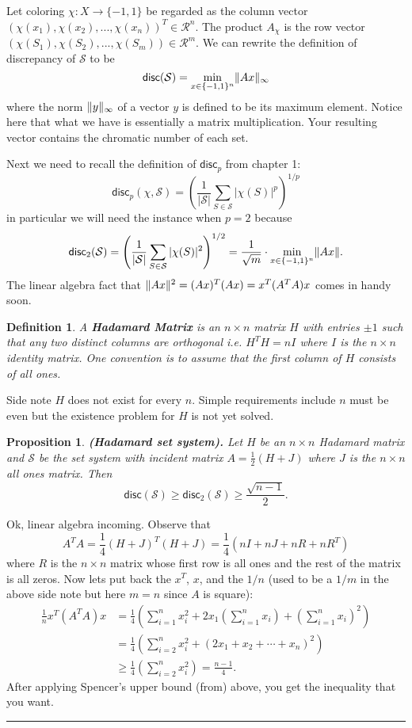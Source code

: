 \documentclass[twoside]{article}
\newtheorem{proposition}[theorem]{Proposition}
\newtheorem{definition}[theorem]{Definition}
\newenvironment{proof}{{\bf Proof:}}{\hfill\rule{2mm}{2mm}}
\newcommand\R{\mathcal{R}}
\newcommand\disc{\mathsf{disc}}
\newcommand\SSet{\mathcal{S}}
\DeclarePairedDelimiter\norm{\parallel}{\parallel}
\begin{document}
Let coloring $\chi: X \rightarrow \{-1, 1\}$ be regarded as the column vector $(\chi(x_1), \chi(x_2), ..., \chi(x_n))^T \in \R^n$. The product $A_{\chi}$ is the row vector $(\chi(S_1), \chi(S_2), ..., \chi(S_m)) \in \R^m$. We can rewrite the definition of discrepancy of $\SSet$ to be
\[\disc(\SSet) = \min_{x \in \{-1,1\}^n} \norm{Ax}_{\infty} \]
where the norm $\norm{y}_{\infty}$ of a vector $y$ is defined to be its maximum element. Notice here that what we have is essentially a matrix multiplication. Your resulting vector contains the chromatic number of each set.

Next we need to recall the definition of $\disc_p$ from chapter 1:
\[\disc_p(\chi, \SSet) = \left( \frac{1}{| \SSet |}\sum_{S \in \SSet} |\chi(S)|^p \right)^{1/p} \]
in particular we will need the instance when $p = 2$ because
\[\disc_2(\SSet) = \left( \frac{1}{| \SSet |}\sum_{S \in \SSet} |\chi(S)|^2 \right)^{1/2} = \frac{1}{\sqrt{m}}\cdot \min_{x \in \{-1, 1\}^n} \norm{Ax}.\]
The linear algebra fact that $\norm{Ax}^2 = (Ax)^T(Ax) = x^T(A^TA)x$ comes in handy soon.

\begin{definition}
A \textbf{Hadamard Matrix} is an $n\times n$ matrix $H$ with entries $\pm 1$ such that any two distinct columns are orthogonal i.e. $H^TH = nI$ where $I$ is the $n\times n$ identity matrix. One convention is to assume that the first column of $H$ consists of all ones.
\end{definition}

Side note $H$ does not exist for every $n$. Simple requirements include $n$ must be even but the existence problem for $H$ is not yet solved. 

\begin{proposition}
\textbf{(Hadamard set system).} Let $H$ be an $n\times n$ Hadamard matrix and $\SSet$ be the set system with incident matrix $A = \frac{1}{2}(H + J)$ where $J$ is the $n\times n$ all ones matrix. Then 
\[\disc(\SSet) \geq \disc_2(\SSet) \geq \frac{\sqrt{n-1}}{2}.\]
\end{proposition}
\begin{proof}
Ok, linear algebra incoming. Observe that
\[A^TA = \frac{1}{4}\left( H + J \right)^T\left( H + J \right) = \frac{1}{4}\left(  nI + nJ + nR + nR^T\right)\]
where $R$ is the $n\times n$ matrix whose first row is all ones and the rest of the matrix is all zeros. Now lets put back the $x^T$, $x$, and the $1/n$ (used to be a $1/m$ in the above side note but here $m = n$ since $A$ is square):
\begin{align*}
\frac{1}{n}x^T(A^TA)x &= \frac{1}{4}\left( \sum_{i=1}^{n}x_i^2 + 2x_1\left( \sum_{i=1}^{n}x_i \right) + \left( \sum_{i=1}^{n} x_i \right)^2 \right)\\
&= \frac{1}{4}\left(  \sum_{i=2}^{n}x_i^2 + (2x_1 + x_2 + \cdots + x_n)^2\right) \\
&\geq  \frac{1}{4}\left( \sum_{i=2}^{n}x_i^2 \right) = \frac{n-1}{4}.
\end{align*}
After applying Spencer's upper bound (from) above, you get the inequality that you want. 
\end{proof}
\end{document}
